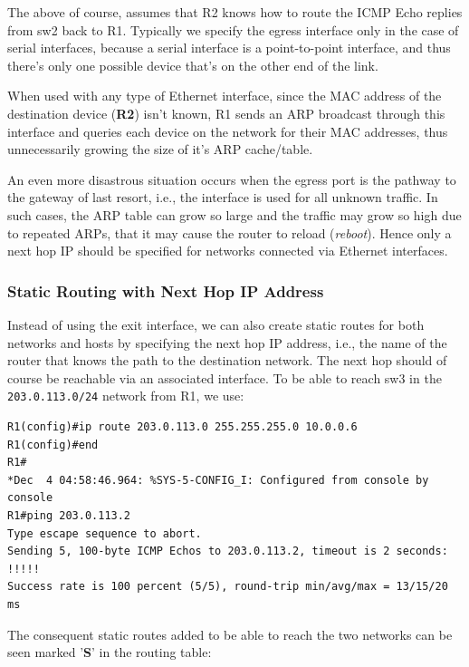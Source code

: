 \noindent
The above of course, assumes that R2 knows how to route the ICMP Echo replies from sw2 back to R1. Typically we specify the egress interface only in the case of serial interfaces, because a serial interface is a point-to-point interface, and thus there's only one possible device that's on the other end of the link. 

When used with any type of Ethernet interface, since the MAC address of the destination device (\textbf{R2}) isn't known, R1 sends an ARP broadcast through this interface and queries each device on the network for their MAC addresses, thus unnecessarily growing the size of it's ARP cache/table. 

An even more disastrous situation occurs when the egress port is the pathway to the gateway of last resort, i.e., the interface is used for all unknown traffic. In such cases, the ARP table can grow so large and the traffic may grow so high due to repeated ARPs, that it may cause the router to reload (\textit{reboot}). Hence only a next hop IP should be specified for networks connected via Ethernet interfaces. 

\subsubsection{Static Routing with Next Hop IP Address}
Instead of using the exit interface, we can also create static routes for both networks and hosts by specifying the next hop IP address, i.e., the name of the router that knows the path to the destination network. The next hop should of course be reachable via an associated interface. To be able to reach sw3 in the \verb|203.0.113.0/24| network from R1, we use: 

\vspace{-15pt}
\begin{verbatim}
R1(config)#ip route 203.0.113.0 255.255.255.0 10.0.0.6
R1(config)#end
R1#
*Dec  4 04:58:46.964: %SYS-5-CONFIG_I: Configured from console by console
R1#ping 203.0.113.2
Type escape sequence to abort.
Sending 5, 100-byte ICMP Echos to 203.0.113.2, timeout is 2 seconds:
!!!!!
Success rate is 100 percent (5/5), round-trip min/avg/max = 13/15/20 ms
\end{verbatim}
\vspace{-10pt}

\noindent
The consequent static routes added to be able to reach the two networks can be seen marked '\textbf{S}' in the routing table:


